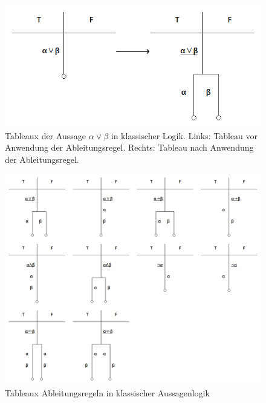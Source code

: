 \begin{figure}[H]
\begin{center}
\includegraphics[scale=0.7]{images/Tableaux_Or_Prop_Logic.png}
\caption{Tableaux der Aussage $\alpha\vee\beta$ in klassischer Logik. Links: Tableau vor Anwendung der Ableitungsregel. Rechts: Tableau nach Anwendung der Ableitungsregel.}
\label{tableaux_prop_or}
\end{center}
\end{figure}

\begin{figure}[H]
\begin{center}
\includegraphics[scale=0.5]{images/Tableaux_Rules_Prop_Logic.png}
\caption{Tableaux Ableitungsregeln in klassischer Aussagenlogik}
\label{tableaux_class_prop_all_rules}
\end{center}
\end{figure}

